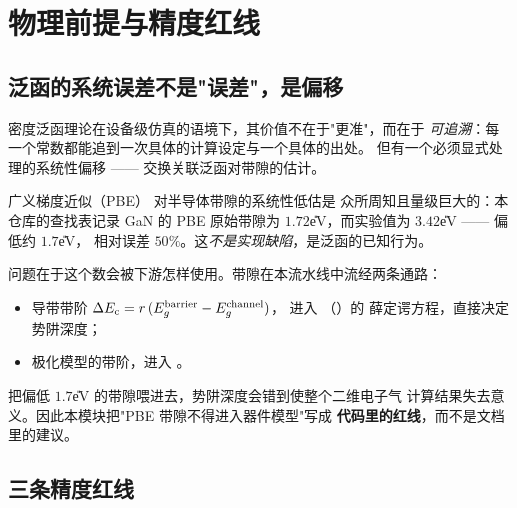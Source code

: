 \section{物理前提与精度红线}
\label{sec:dft-premise}

\subsection{泛函的系统误差不是"误差"，是偏移}
\label{sec:dft-functional}

密度泛函理论在设备级仿真的语境下，其价值不在于"更准"，而在于
\emph{可追溯}：每一个常数都能追到一次具体的计算设定与一个具体的出处。
但有一个必须显式处理的系统性偏移 —— 交换关联泛函对带隙的估计。

广义梯度近似（PBE）\cite{perdew1996} 对半导体带隙的系统性低估是
众所周知且量级巨大的：本仓库的查找表记录 GaN 的 PBE 原始带隙为
$1.72$\U{eV}，而实验值为 $3.42$\U{eV} —— 偏低约 $1.7$\U{eV}，
相对误差 $50\%$。这\emph{不是实现缺陷}，是泛函的已知行为。

问题在于这个数会被下游怎样使用。带隙在本流水线中流经两条通路：

\begin{itemize}[leftmargin=1.7em,itemsep=0.3em,topsep=0.35em]
  \item 导带带阶 $\Delta E_{\mathrm{c}}=r\,(E_g^{\text{barrier}}-E_g^{\text{channel}})$，
        进入 （）的
        薛定谔方程，直接决定势阱深度；
  \item 极化模型的带阶，进入 。
\end{itemize}

把偏低 $1.7$\U{eV} 的带隙喂进去，势阱深度会错到使整个二维电子气
计算结果失去意义。因此本模块把"PBE 带隙不得进入器件模型"写成
\textbf{代码里的红线}，而不是文档里的建议。

\subsection{三条精度红线}
\label{sec:dft-redlines}

